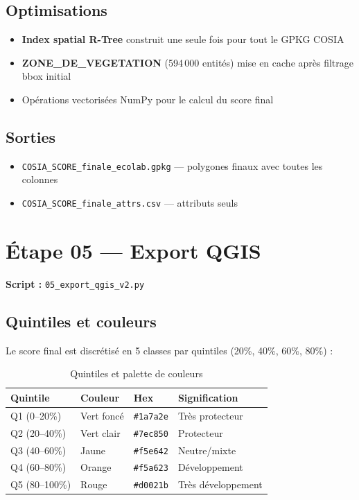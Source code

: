 \documentclass[12pt,a4paper]{report}
\newcommand{\code}[1]{\texttt{\small #1}}
\begin{document}
\subsection{Optimisations}

\begin{itemize}
  \item \textbf{Index spatial R-Tree} construit une seule fois pour tout le GPKG COSIA
  \item \textbf{ZONE\_DE\_VEGETATION} (594\,000 entités) mise en cache après filtrage bbox initial
  \item Opérations vectorisées NumPy pour le calcul du score final
\end{itemize}

\subsection{Sorties}

\begin{itemize}
  \item \code{COSIA\_SCORE\_finale\_ecolab.gpkg} — polygones finaux avec toutes les colonnes
  \item \code{COSIA\_SCORE\_finale\_attrs.csv} — attributs seuls
\end{itemize}

\section{Étape 05 — Export QGIS}

\textbf{Script :} \code{05\_export\_qgis\_v2.py}

\subsection{Quintiles et couleurs}

Le score final est discrétisé en 5 classes par quintiles (20\%, 40\%, 60\%, 80\%) :

\begin{table}[H]
\centering
\begin{tabular}{llll}
\toprule
\textbf{Quintile} & \textbf{Couleur} & \textbf{Hex} & \textbf{Signification} \\
\midrule
\rowcolor{scoreQ1!20} Q1 (0–20\%) & Vert foncé & \code{\#1a7a2e} & Très protecteur \\
\rowcolor{scoreQ2!20} Q2 (20–40\%) & Vert clair & \code{\#7ec850} & Protecteur \\
\rowcolor{scoreQ3!20} Q3 (40–60\%) & Jaune & \code{\#f5e642} & Neutre/mixte \\
\rowcolor{scoreQ4!20} Q4 (60–80\%) & Orange & \code{\#f5a623} & Développement \\
\rowcolor{scoreQ5!20} Q5 (80–100\%) & Rouge & \code{\#d0021b} & Très développement \\
\bottomrule
\end{tabular}
\caption{Quintiles et palette de couleurs}
\end{table}
\end{document}
